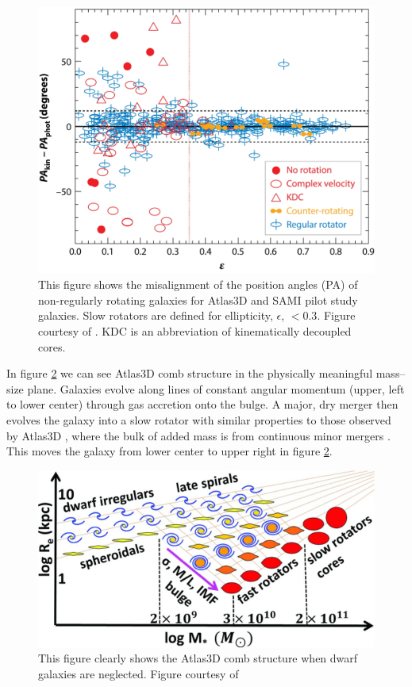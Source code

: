 	\begin{figure}
		\centering
		\includegraphics[width=\textwidth]{introduction/misalignment.jpg}
		\caption[The kinematic--photometric misalignment in slow rotators]{This figure shows the misalignment of the position angles (PA) of non-regularly rotating galaxies for Atlas3D and SAMI pilot study galaxies. Slow rotators are defined for ellipticity, $\epsilon$, $<0.3$. Figure courtesy of \citet{Cappellari2016}. KDC is an abbreviation of kinematically decoupled cores.}
		\label{fig:MassRe}
	\end{figure}

	In figure \ref{fig:MassRe} we can see Atlas3D comb structure in the physically meaningful mass--size plane. Galaxies evolve along lines of constant angular momentum (upper, left to lower center) through gas accretion onto the bulge. A major, dry merger then evolves the galaxy into a slow rotator \citep{Bendo2000} with similar properties to those observed by Atlas3D \citep{Jesseit2007, Jesseit2009}, where the bulk of added mass is from continuous minor mergers \cite{DeLucia2007, Genel2008, Feldmann2010, Oser2010, Feldmann2011, Hirschmann2012}. This moves the galaxy from lower center to upper right in figure \ref{fig:MassRe}. 

	\begin{figure}
		\centering
		\includegraphics[width=\textwidth]{introduction/mass_Re.jpg}
		\caption[The galaxy mass--size plane]{This figure clearly shows the Atlas3D comb structure when dwarf galaxies are neglected. Figure courtesy of \citet{Cappellari2013a}}
		\label{fig:MassRe}
	\end{figure}

